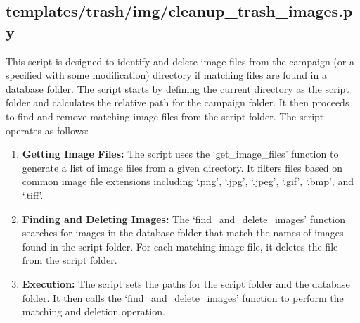 \subsection{templates/trash/img/cleanup_trash_images.py}

This script is designed to identify and delete image files from the campaign (or a specified with some modification) directory if matching files are found in a database folder. The script starts by defining the current directory as the script folder and calculates the relative path for the campaign folder. It then proceeds to find and remove matching image files from the script folder. The script operates as follows:

\begin{enumerate}
    \item \textbf{Getting Image Files:} The script uses the `get\_image\_files' function to generate a list of image files from a given directory. It filters files based on common image file extensions including `.png', `.jpg', `.jpeg', `.gif', `.bmp', and `.tiff'.
    
    \item \textbf{Finding and Deleting Images:} The `find\_and\_delete\_images' function searches for images in the database folder that match the names of images found in the script folder. For each matching image file, it deletes the file from the script folder.
    
    \item \textbf{Execution:} The script sets the paths for the script folder and the database folder. It then calls the `find\_and\_delete\_images' function to perform the matching and deletion operation.
\end{enumerate}








